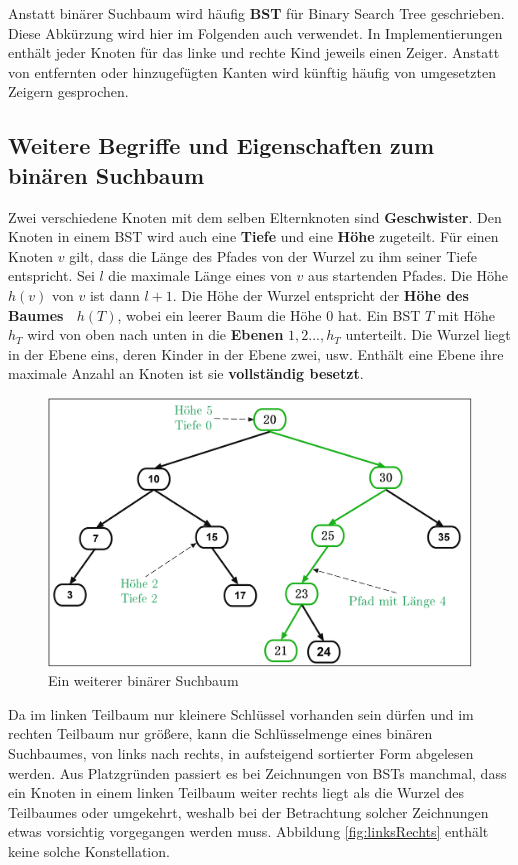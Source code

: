 \documentclass[a4paper,12pt]{article}
\begin{document}
\noindent Anstatt binärer Suchbaum wird häufig \textbf{BST} für Binary Search Tree geschrieben. Diese Abkürzung wird hier im Folgenden auch verwendet. In Implementierungen enthält jeder Knoten für das linke und rechte Kind jeweils einen Zeiger. Anstatt von entfernten oder hinzugefügten Kanten wird künftig häufig von umgesetzten Zeigern gesprochen. 	
\subsection{Weitere Begriffe und Eigenschaften zum binären Suchbaum}	
\noindent Zwei verschiedene Knoten mit dem selben Elternknoten sind \textbf{Geschwister}. Den Knoten in einem BST wird auch eine \textbf{Tiefe} und eine \textbf{Höhe} zugeteilt. Für einen Knoten $v$ gilt, dass die Länge des Pfades von der Wurzel zu ihm seiner Tiefe entspricht. Sei $l$ die maximale Länge eines von $v$ aus startenden Pfades. Die Höhe $\mathit{h(v)}$ von $v$ ist dann $l+1$. Die Höhe der Wurzel entspricht der \textbf{Höhe des Baumes~ $h(T)$}, wobei ein leerer Baum die Höhe $0$ hat. Ein BST $T$ mit Höhe $h_T$ wird von oben nach unten in die \textbf{Ebenen} $\mathit{1,2...,h_T}$ unterteilt. Die Wurzel liegt in der Ebene eins, deren Kinder in der Ebene zwei, usw. Enthält eine Ebene ihre maximale Anzahl an Knoten ist sie \textbf{vollständig besetzt}.
\begin{figure}[H]
	\centering
	\includegraphics[width= 1\textwidth]{Medien/Einleitung/suchbaum2_2}
	\caption{Ein weiterer binärer Suchbaum }
	\label{fig:suchbaum2_2}
\end{figure}

\noindent Da im linken Teilbaum nur kleinere Schlüssel vorhanden sein dürfen und im rechten Teilbaum nur größere, kann die Schlüsselmenge eines binären Suchbaumes, von links nach rechts, in aufsteigend sortierter Form abgelesen werden. Aus Platzgründen passiert es bei Zeichnungen von BSTs manchmal, dass ein Knoten in einem linken Teilbaum weiter rechts liegt als die Wurzel des Teilbaumes oder umgekehrt, weshalb bei der Betrachtung solcher Zeichnungen etwas vorsichtig vorgegangen werden muss. Abbildung \ref{fig:linksRechts} enthält keine solche Konstellation.  
\end{document}
